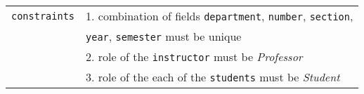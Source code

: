 \begin{table}[ht]
\begin{tabular}[ht]{r|l}
        \texttt{constraints} & 
            1. combination of fields
                \texttt{department},
                \texttt{number},
                \texttt{section}, \\ &
                \hspace{1.3em}\texttt{year},
                \texttt{semester} must be unique \\
            & 2. role of the \texttt{instructor} must be \emph{Professor} \\
            & 3. role of the each of the \texttt{students} must be \emph{Student} \\
        \hline
    \end{tabular}
    \renewcommand{\arraystretch}{1}
    
\end{table}





